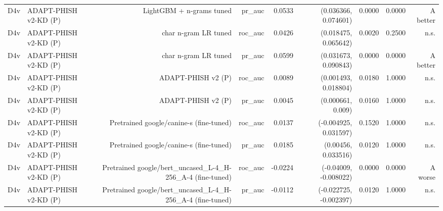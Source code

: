 \begin{table}[t]
\begin{tabular}{llrrrrrrr}
D4v & ADAPT-PHISH v2-KD (P) & LightGBM + n-grams tuned & pr\_auc & 0.0533 & (0.036366, 0.074601) & 0.0000 & 0.0000 & A better \\
D4v & ADAPT-PHISH v2-KD (P) & char n-gram LR tuned & roc\_auc & 0.0426 & (0.018475, 0.065642) & 0.0020 & 0.2500 & n.s. \\
D4v & ADAPT-PHISH v2-KD (P) & char n-gram LR tuned & pr\_auc & 0.0599 & (0.031673, 0.090843) & 0.0000 & 0.0000 & A better \\
D4v & ADAPT-PHISH v2-KD (P) & ADAPT-PHISH v2 (P) & roc\_auc & 0.0089 & (0.001493, 0.018804) & 0.0180 & 1.0000 & n.s. \\
D4v & ADAPT-PHISH v2-KD (P) & ADAPT-PHISH v2 (P) & pr\_auc & 0.0045 & (0.000661, 0.009) & 0.0160 & 1.0000 & n.s. \\
D4v & ADAPT-PHISH v2-KD (P) & Pretrained google/canine-s (fine-tuned) & roc\_auc & 0.0137 & (-0.004925, 0.031597) & 0.1520 & 1.0000 & n.s. \\
D4v & ADAPT-PHISH v2-KD (P) & Pretrained google/canine-s (fine-tuned) & pr\_auc & 0.0185 & (0.00456, 0.033516) & 0.0120 & 1.0000 & n.s. \\
D4v & ADAPT-PHISH v2-KD (P) & Pretrained google/bert\_uncased\_L-4\_H-256\_A-4 (fine-tuned) & roc\_auc & -0.0224 & (-0.04009, -0.008022) & 0.0000 & 0.0000 & A worse \\
D4v & ADAPT-PHISH v2-KD (P) & Pretrained google/bert\_uncased\_L-4\_H-256\_A-4 (fine-tuned) & pr\_auc & -0.0112 & (-0.022725, -0.002397) & 0.0120 & 1.0000 & n.s. \\
\bottomrule
\end{tabular}
\end{table}
